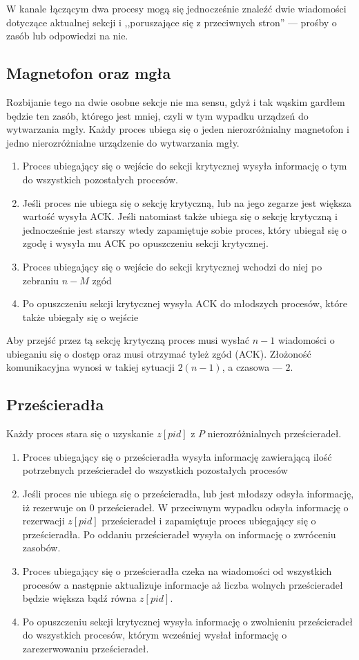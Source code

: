 \documentclass{article}
\begin{document}
W kanale łączącym dwa procesy mogą się jednocześnie znaleźć dwie wiadomości dotyczące aktualnej sekcji i ,,poruszające się z przeciwnych stron'' --- prośby o zasób lub odpowiedzi na nie.


\subsection{Magnetofon oraz mgła}
Rozbijanie tego na dwie osobne sekcje nie ma sensu, gdyż i tak wąskim gardłem będzie ten zasób, którego jest mniej, czyli w tym wypadku urządzeń do wytwarzania mgły. Każdy proces ubiega się o jeden nierozróżnialny magnetofon i jedno nierozróżnialne urządzenie do wytwarzania mgły.
\begin{enumerate}
    \item Proces ubiegający się o wejście do sekcji krytycznej wysyła informację o tym do wszystkich pozostałych procesów. 
    \item Jeśli proces nie ubiega się o sekcję krytyczną, lub na jego zegarze jest większa wartość wysyła ACK. Jeśli natomiast także ubiega się o sekcję krytyczną i jednocześnie jest starszy wtedy zapamiętuje sobie proces, który ubiegał się o zgodę i wysyła mu ACK po opuszczeniu sekcji krytycznej.
    \item Proces ubiegający się o wejście do sekcji krytycznej wchodzi do niej po zebraniu $n - M$ zgód
    \item Po opuszczeniu sekcji krytycznej wysyła ACK do młodszych procesów, które także ubiegały się o wejście
\end{enumerate}

Aby przejść przez tą sekcję krytyczną proces musi wysłać $n-1$ wiadomości o ubieganiu się o dostęp oraz musi otrzymać tyleż zgód (ACK).
Złożoność komunikacyjna wynosi w takiej sytuacji $2(n-1)$, a czasowa --- $2$.

\subsection{Prześcieradła}
Każdy proces stara się o uzyskanie $z[pid]$ z $P$ nierozróżnialnych prześcieradeł.
\begin{enumerate}
    \item Proces ubiegający się o prześcieradła wysyła informację zawierającą ilość potrzebnych prześcieradeł do wszystkich pozostałych procesów
    \item Jeśli proces nie ubiega się o prześcieradła, lub jest młodszy odsyła informację, iż rezerwuje on $0$ prześcieradeł. W przeciwnym wypadku odsyła informację o rezerwacji $z[pid]$ prześcieradeł i zapamiętuje proces ubiegający się o prześcieradła. Po oddaniu prześcieradeł wysyła on informację o zwróceniu zasobów.
    \item Proces ubiegający się o prześcieradła czeka na wiadomości od wszystkich procesów a następnie aktualizuje informacje aż liczba wolnych prześcieradeł będzie większa bądź równa $z[pid]$.
    \item Po opuszczeniu sekcji krytycznej wysyła informację o zwolnieniu prześcieradeł do wszystkich procesów, którym wcześniej wysłał informację o zarezerwowaniu prześcieradeł.
\end{enumerate}
\end{document}
